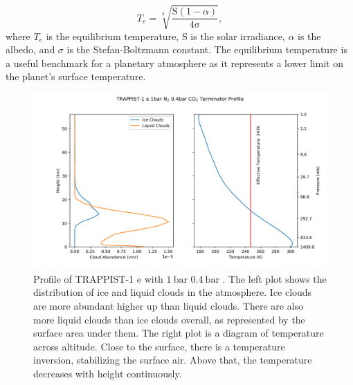 \begin{equation}
    T_e=\sqrt[4]{\frac{\mathrm{S} (1-\alpha)}{4\mathrm{\sigma}}},
\end{equation}
where $T_e$ is the equilibrium temperature, S is the solar irradiance, $\alpha$
 is the albedo, and $\sigma$ is the Stefan-Boltzmann constant. The equilibrium
 temperature is a useful benchmark for a planetary atmosphere as it represents a
 lower limit on the planet's surface temperature.

\begin{figure}
    \begin{center}
        \includegraphics[width=\textwidth]{models/atmosphere_profile.png}
        \caption[TRAPPIST-1 e Atmosphere Profile]{Profile of TRAPPIST-1 e with
        $\SI{1}{\bar}$  $\SI{0.4}{\bar}$ . The left plot shows the distribution
        of ice and liquid clouds in the atmosphere. Ice clouds are more abundant
        higher up than liquid clouds. There are also more liquid clouds than
        ice clouds overall, as represented by the surface area under them. The
        right plot is a diagram of temperature across altitude. Close to the
        surface, there is a temperature inversion, stabilizing the surface air.
        Above that, the temperature decreases with height continuously.}
        \label{fig:profile}
    \end{center}
\end{figure}


